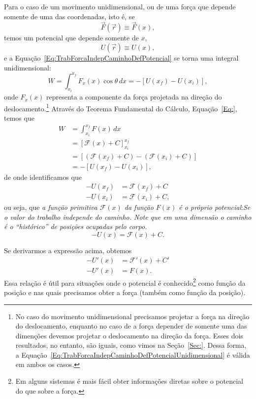 Para o caso de um movimento unidimensional, ou de uma força que depende somente de uma das coordenadas, isto é, se
\begin{equation}
    \vec{F}(\vec{r}) \equiv \vec{F}(x),
\end{equation}
%
temos um potencial que depende somente de $x$,
\begin{equation}
    U(\vec{r}) \equiv U(x),
\end{equation}
%
e a Equação~\eqref{Eq:TrabForcaIndepCaminhoDefPotencial} se torna uma integral unidimensional:
\begin{equation}\label{Eq:TrabForcaIndepCaminhoDefPotencialUnidimensional}
    W = \int_{x_i}^{x_f} F_x(x) \cos\theta \,dx = -[U(x_f) - U(x_i)],
\end{equation}
%
onde $F_x(x)$ representa a componente da força projetada na direção do deslocamento.\footnote{No caso do movimento unidimensional precisamos projetar a força na direção do deslocamento, enquanto no caso de a força depender de somente uma das dimenções devemos projetar o deslocamento na direção da força. Esses dois resultados, no entanto, são iguais, como vimos na Seção~\ref{Sec:}. Dessa forma, a Equação~\eqref{Eq:TrabForcaIndepCaminhoDefPotencialUnidimensional} é válida em ambos os casos.}
%
Através do Teorema Fundamental do Cálculo, Equação~\ref{Eq:}, temos que
\begin{align}
    W &= \int_{x_i}^{x_f} F(x) \,dx \\
    &= \left[\mathcal{F}(x) + C\right]_{x_i}^{x_f} \\
    &= [(\mathcal{F}(x_f) + C) - (\mathcal{F}(x_i) + C)] \\
    &= -[U(x_f) - U(x_i)],
\end{align}
%
de onde identificamos que
\begin{align}
    - U(x_f) &= \mathcal{F}(x_f) + C \\
    - U(x_i) &= \mathcal{F}(x_i) + C,
\end{align}
%
ou seja, que \emph{a função primitiva $\mathcal{F}(x)$ da função $F(x)$ é o próprio potencial}:\emph{Se o valor do trabalho independe do caminho. Note que em uma dimensão o caminho é o ``histórico'' de posições ocupadas pelo corpo.}
\begin{equation}
    - U(x) = \mathcal{F}(x) + C.
\end{equation}

Se derivarmos a expressão acima, obtemos
\begin{align}
    - U'(x) &= \mathcal{F}'(x) + C' \\
    - U'(x) &= F(x).
\end{align}
%
Essa relação é útil para situações onde o potencial é conhecido\footnote{Em alguns sistemas é mais fácil obter informações diretas sobre o potencial do que sobre a força.} como função da posição e nas quais precisamos obter a força (também como função da posição).


